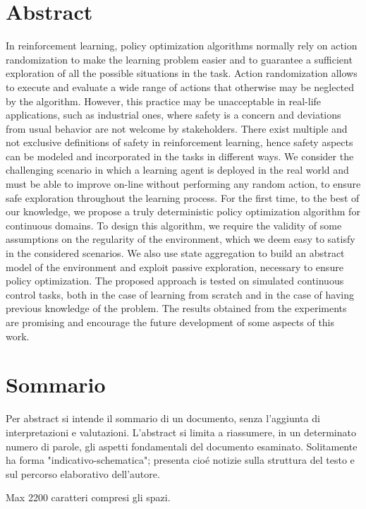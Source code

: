 
\begingroup
\let\clearpage\relax
\let\cleardoublepage\relax
\let\cleardoublepage\relax

\chapter*{Abstract}
In reinforcement learning, policy optimization algorithms normally rely on action randomization to make the learning problem easier and to guarantee a sufficient exploration of all the possible situations in the task. Action randomization allows to execute and evaluate a wide range of actions that otherwise may be neglected by the algorithm. However, this practice may be unacceptable in real-life applications, such as industrial ones, where safety is a concern and deviations from usual behavior are not welcome by stakeholders. There exist multiple and not exclusive definitions of safety in reinforcement learning, hence safety aspects can be modeled and incorporated in the tasks in different ways. We consider the challenging scenario in which a learning agent is deployed in the real world and must be able to improve on-line without performing any random action, to ensure safe exploration throughout the learning process. For the first time, to the best of our knowledge, we propose a truly deterministic policy optimization algorithm for continuous domains. To design this algorithm, we require the validity of some assumptions on the regularity of the environment, which we deem easy to satisfy in the considered scenarios. We also use state aggregation to build an abstract model of the environment and exploit passive exploration, necessary to ensure policy optimization. The proposed approach is tested on simulated continuous control tasks, both in the case of learning from scratch and in the case of having previous knowledge of the problem. The results obtained from the experiments are promising and encourage the future development of some aspects of this work.

\vfill
\newpage
{}
\chapter*{Sommario}
Per abstract si intende il sommario di un documento, senza l'aggiunta di interpretazioni e valutazioni. L'abstract si limita a riassumere, in un determinato numero di parole, gli aspetti fondamentali del documento esaminato. Solitamente ha forma "indicativo-schematica"; presenta cioé notizie sulla struttura del testo e sul percorso elaborativo dell'autore.

Max 2200 caratteri compresi gli spazi.

\endgroup
